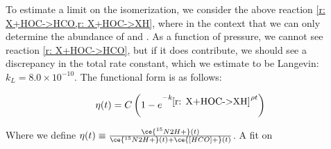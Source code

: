 To estimate a limit on the isomerization, we consider the above reaction \cref{r: X+HOC->HCO,r: X+HOC->XH}, where  in the context that we can only determine the abundance of \ce{[HCO]+} and . As a function of pressure, we cannot see reaction \ref{r: X+HOC->HCO}, but if it does contribute, we should see a discrepancy in the total rate constant, which we estimate to be Langevin: $k_L = 8.0 \times 10^{-10}$. The functional form is as follows:


\begin{equation}
	\eta(t) = C \left( 1-e^{-k_{\ref{r: X+HOC->XH}} \rho t} \right)
\end{equation}

Where we define $\eta(t) \equiv \frac{\ce{^{15}N2H+}(t)}{\ce{^{15}N2H+}(t)+\ce{[HCO]+}(t)}$. A fit on 